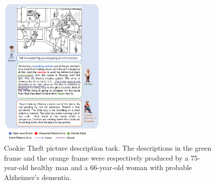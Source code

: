 \begin{figure}[th]
    \centering
    \includegraphics[width=0.45\textwidth]{figs/cookie_theft_description8.pdf}
    \caption{Cookie Theft picture description task. 
    The descriptions in the green frame and the orange frame were respectively produced by a 75-year-old healthy man and a 66-year-old woman with probable Alzheimer's dementia\protect\footnotemark. 
    }
    \label{fig:cookie_theft}
\end{figure}

